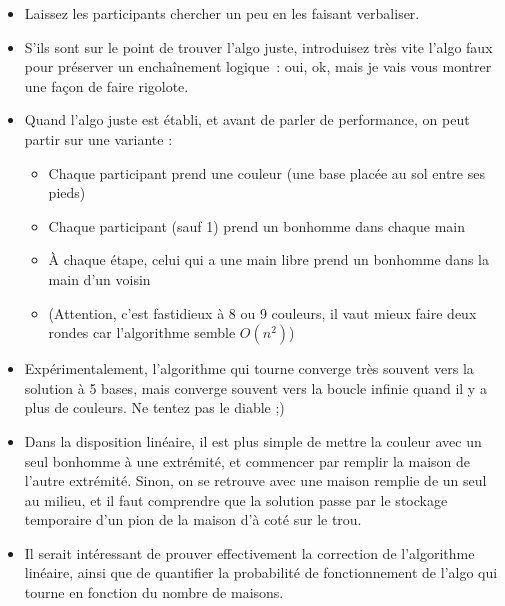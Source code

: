 \begin{itemize}
\item Laissez les participants chercher un peu en les faisant verbaliser.
\item S'ils sont sur le point de trouver l'algo juste, introduisez très vite
  l'algo faux pour préserver un enchaînement logique~: \og oui, ok, mais je vais
  vous montrer une façon de faire rigolote. \fg
\item Quand l'algo juste est établi, et avant de parler de performance, on peut
  partir sur une variante :
  \begin{itemize}
  \item Chaque participant prend une couleur (une base placée au sol entre ses
    pieds)
  \item Chaque participant (sauf 1) prend un bonhomme dans chaque main
  \item À chaque étape, celui qui a une main libre prend un bonhomme dans la
    main d'un voisin
  \item (Attention, c'est fastidieux à 8 ou 9 couleurs, il vaut mieux faire deux
    rondes car l'algorithme semble $O(n^2)$)
  \end{itemize}
\item Expérimentalement, l'algorithme qui tourne converge très souvent vers la
  solution à 5 bases, mais converge souvent vers la boucle infinie quand il y a
  plus de couleurs. Ne tentez pas le diable ;)
\item Dans la disposition linéaire, il est plus simple de mettre la couleur avec
  un seul bonhomme à une extrémité, et commencer par remplir la maison de
  l'autre extrémité. Sinon, on se retrouve avec une maison remplie de un seul au
  milieu, et il faut comprendre que la solution passe par le stockage temporaire
  d'un pion de la maison d'à coté sur le trou.
\item Il serait intéressant de prouver effectivement la correction de
  l'algorithme linéaire, ainsi que de quantifier la probabilité de
  fonctionnement de l'algo qui tourne en fonction du nombre de maisons.
\end{itemize}


